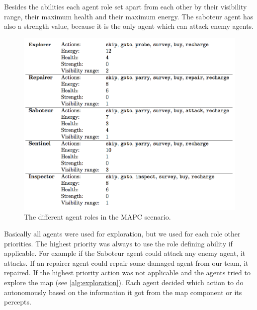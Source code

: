 Besides the abilities each agent role set apart from each other by their visibility range, their maximum health and their maximum energy.
The saboteur agent has also a strength value, because it is the only agent which can attack enemy agents.
\begin{figure}[ht]
  \centering
  \includegraphics[width=0.9\linewidth]{images/roles.png}
  \caption{The different agent roles in the MAPC scenario.}
  \label{fig:arc:roles}
\end{figure}

Basically all agents were used for exploration, but we used for each role other priorities.
The highest priority was always to use the role defining ability if applicable.
For example if the Saboteur agent could attack any enemy agent, it attacks.
If an repairer agent could repair some damaged agent from our team, it repaired.
If the highest priority action was not applicable and the agents tried to explore the map (see \autoref{alg:exploration}).
Each agent decided which action to do autonomously based on the information it got from the map component or its percepts.

